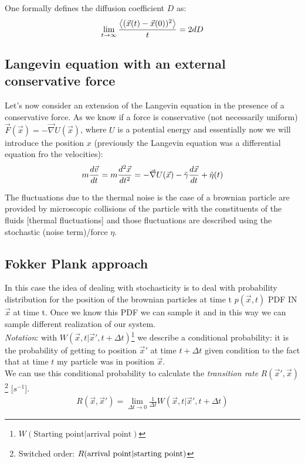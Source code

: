 \documentclass[\main/main.tex]{subfiles}
\begin{document}
One formally defines the diffusion coefficient $D$ as:
\begin{eqnarray}
\lim_{t \to \infty} \frac{\left\langle (\Vec{x}(t) - \Vec{x}(0))^2 \right\rangle}{t}=2dD
\end{eqnarray}

\subsection{Langevin equation with an external conservative force}
Let's now consider an extension of the Langevin equation in the presence of a conservative force. As we know if a force is conservative (not necessarily uniform) $\Vec{F}(\Vec{x})=-\Vec{\nabla}U(\Vec{x})$, where $U$ is a potential energy and essentially now we will introduce the position $x$ (previously the Langevin equation was a differential equation fro the velocities):
\begin{eqnarray}
m\frac{d\Vec{v}}{dt}=m\frac{d^2\Vec{x}}{dt^2}=-\Vec{\nabla}U(\Vec{x})-\Tilde{\gamma}\frac{d\Vec{x}}{dt}+\Tilde{\eta}(t)
\end{eqnarray}

The fluctuations due to the thermal noise is the case of a brownian particle are provided by microscopic collisions of the particle with the constituents of the fluids [thermal fluctuations] and those fluctuations are described using the stochastic (noise term)/force $\eta$.

\subsection{Fokker Plank approach}
In this case the idea of dealing with stochasticity is to deal with probability distribution for the position of the brownian particles at time t $p(\Vec{x},t)$ PDF IN $\Vec{x}$ at time t. Once we know this PDF we can sample it and in this way we can sample different realization of our system. \\

\textit{Notation}: with $W(\Vec{x},t | \Vec{x}',t+\Delta t)$\;\footnote{$W(\text{Starting point} | \text{arrival point})$} we describe a conditional probability: it is the probability of getting to position $\Vec{x}'$ at time $t+\Delta t$ given condition to the fact that at time $t$ my particle was in position $\Vec{x}$. \\

We can use this conditional probability to calculate the \textit{transition rate} $R(\Vec{x}',\Vec{x})$ \; \footnote{Switched order: $R(\text{arrival point|\text{starting point}})$} [$s^{-1}$].
\begin{eqnarray}
R(\Vec{x},\Vec{x}')=\lim_{\Delta t \to 0} \frac{1}{\Delta t} W(\Vec{x},t | \Vec{x}',t+\Delta t)
\end{eqnarray}
\end{document}

